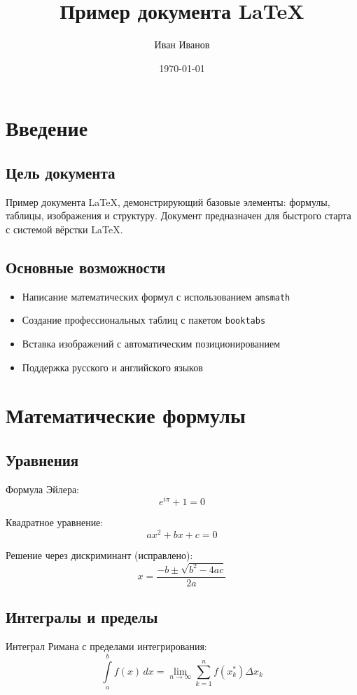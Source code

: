 \documentclass[a4paper,12pt]{article}
\title{Пример документа LaTeX}
\author{Иван Иванов}
\date{\today}
\begin{document}
\maketitle
\tableofcontents
\newpage

\section{Введение}
\subsection{Цель документа}
Пример документа LaTeX, демонстрирующий базовые элементы: формулы, таблицы, изображения и структуру. Документ предназначен для быстрого старта с системой вёрстки LaTeX.

\subsection{Основные возможности}
\begin{itemize}
    \item Написание математических формул с использованием \texttt{amsmath}
    \item Создание профессиональных таблиц с пакетом \texttt{booktabs}
    \item Вставка изображений с автоматическим позиционированием
    \item Поддержка русского и английского языков
\end{itemize}

\section{Математические формулы}
\subsection{Уравнения}
Формула Эйлера:
\[
e^{i\pi} + 1 = 0
\]

Квадратное уравнение:
\[
ax^2 + bx + c = 0
\]

Решение через дискриминант (исправлено):
\[
x = \frac{-b \pm \sqrt{b^2 - 4ac}}{2a}
\]

\subsection{Интегралы и пределы}
Интеграл Римана с пределами интегрирования:
\[
\int\limits_a^b f(x)\,dx = \lim_{n\to\infty} \sum_{k=1}^n f(x_k^*)\Delta x_k
\]
\end{document}
